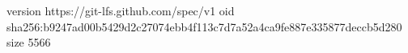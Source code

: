 version https://git-lfs.github.com/spec/v1
oid sha256:b9247ad00b5429d2c27074ebb4f113c7d7a52a4ca9fe887e335877deccb5d280
size 5566
